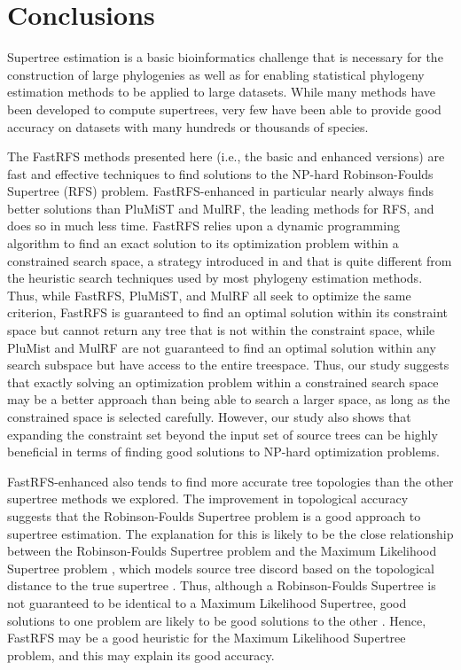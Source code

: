 \section{Conclusions}


Supertree estimation is a basic bioinformatics challenge that 
is necessary for the construction of large phylogenies as well 
as for enabling statistical phylogeny estimation methods to be applied to large datasets. 
While many methods have been developed to compute supertrees, very few have
been able to provide good accuracy on datasets with many hundreds or thousands
of species.

The FastRFS methods presented
here (i.e., the basic and enhanced versions) are fast and effective techniques 
to find solutions 
to the  NP-hard Robinson-Foulds Supertree (RFS) problem.
FastRFS-enhanced in particular nearly always finds better
solutions than PluMiST and MulRF, the leading
methods for RFS,
and does so 
 in much less time.
FastRFS relies upon a dynamic programming algorithm to find an 
exact solution to its optimization problem within a constrained search space,
a strategy introduced in 
\cite{hallett2000new}
and that  is
quite different from
the heuristic search
techniques used by most phylogeny estimation methods. 
Thus, while  FastRFS, PluMiST, and MulRF all seek to optimize the same criterion, 
FastRFS is guaranteed to find an optimal solution within its constraint space but cannot return any tree that is not within the constraint space, while PluMist and MulRF are not guaranteed to find an optimal solution within any search subspace but have access to the entire treespace. 
Thus, our study suggests that
  exactly solving
an optimization problem within a constrained search space
may be a better approach than being able to search a larger space,
as long as the constrained space is selected carefully.
However, our study also shows that expanding the constraint
set beyond the input set of source trees can be highly beneficial
in terms of finding good solutions to NP-hard optimization
problems.

FastRFS-enhanced also tends to find more accurate
tree topologies than the other supertree methods
we explored. 
The improvement in topological accuracy
suggests that 
the Robinson-Foulds Supertree problem is
a good approach to supertree estimation.
The explanation for this
is likely to be the 
close relationship between the Robinson-Foulds
Supertree problem and 
the Maximum Likelihood Supertree problem
\cite{BryantSteel2009}, which
models source tree discord based on the topological distance
to the true supertree
\cite{ml-supertree}.
Thus, although a Robinson-Foulds
Supertree is not guaranteed to be identical
to a Maximum Likelihood Supertree,
good solutions to one problem are likely to be good
solutions to the other \cite{BryantSteel2009}.
Hence, 
FastRFS 
may be a good heuristic for the Maximum 
Likelihood Supertree problem,
and this may explain its good accuracy.    


